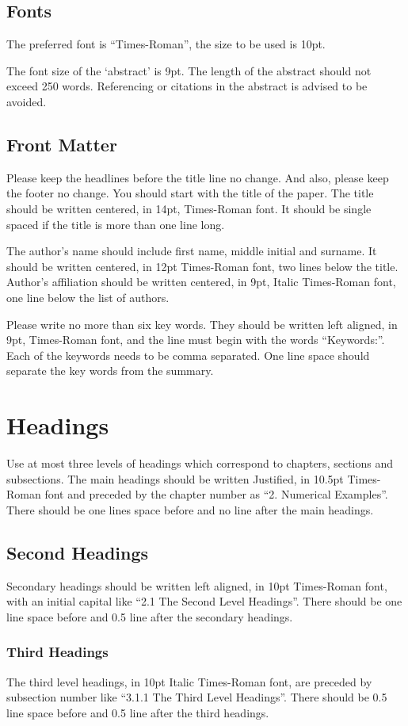 \documentclass[english]{brccms-hu}
\begin{document}
\subsection{Fonts}
The preferred font is “Times-Roman”, the size to be used is 10pt.

The font size of the ‘abstract’ is 9pt. The length of the abstract should not exceed 250 words. Referencing or citations in the abstract is advised to be avoided.
\subsection{Front Matter}
Please keep the headlines before the title line no change. And also, please keep the footer no change. You should start with the title of the paper. The title should be written centered, in 14pt, Times-Roman font. It should be single spaced if the title is more than one line long.

The author's name should include first name, middle initial and surname. It should be written centered, in 12pt Times-Roman font, two lines below the title. Author's affiliation should be written centered, in 9pt, Italic Times-Roman font, one line below the list of authors.

Please write no more than six key words. They should be written left aligned, in 9pt, Times-Roman font, and the line must begin with the words “Keywords:”. Each of the keywords needs to be comma separated. One line space should separate the key words from the summary.
\section{Headings}
Use at most three levels of headings which 
correspond to chapters, sections and subsections. The 
main headings should be written Justified, in 10.5pt 
Times-Roman font and preceded by the chapter 
number as “2. Numerical Examples”. There should be 
one lines space before and no line after the main 
headings.
\subsection{Second Headings}
Secondary headings should be written left aligned, 
in 10pt Times-Roman font, with an initial capital like 
“2.1 The Second Level Headings”. There should be 
one line space before and 0.5 line after the secondary 
headings.
\subsubsection{Third Headings}
The third level headings, in 10pt Italic Times-Roman font, are preceded by subsection number like 
“3.1.1 The Third Level Headings”. There should be 0.5 
line space before and 0.5 line after the third headings.
\end{document}
